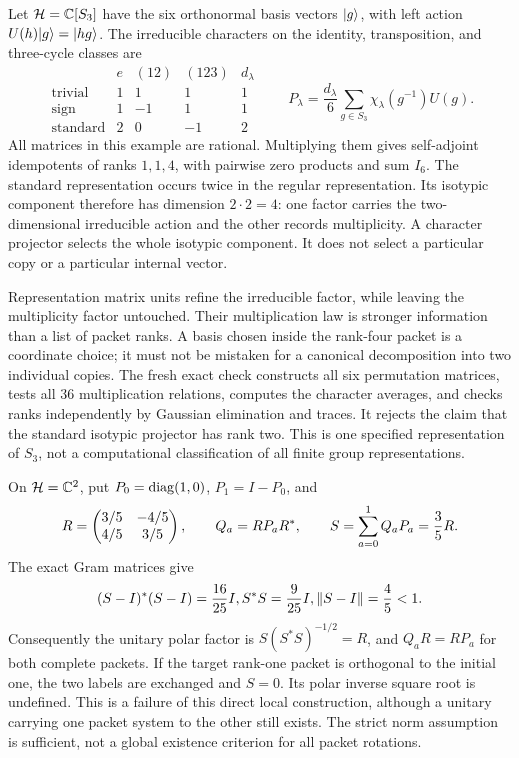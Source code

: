Let $\HH=\CC[S_3]$ have the six orthonormal basis vectors $\lvert g\rangle$, with left action $U(h)\lvert g\rangle=\lvert hg\rangle$. The irreducible characters on the identity, transposition, and three-cycle classes are
\[
\begin{array}{c|rrr|r}
 & e & (12)&(123)&d_\lambda\\\hline
\text{trivial}&1&1&1&1\\
\text{sign}&1&-1&1&1\\
\text{standard}&2&0&-1&2
\end{array}
\qquad
P_\lambda=\frac{d_\lambda}{6}\sum_{g\in S_3}\chi_\lambda(g^{-1})U(g).
\]
All matrices in this example are rational. Multiplying them gives self-adjoint idempotents of ranks $1,1,4$, with pairwise zero products and sum $I_6$.
The standard representation occurs twice in the regular representation. Its isotypic component therefore has dimension $2\cdot2=4$: one factor carries the two-dimensional irreducible action and the other records multiplicity. A character projector selects the whole isotypic component. It does not select a particular copy or a particular internal vector.

Representation matrix units refine the irreducible factor, while leaving the multiplicity factor untouched. Their multiplication law is stronger information than a list of packet ranks. A basis chosen inside the rank-four packet is a coordinate choice; it must not be mistaken for a canonical decomposition into two individual copies.
The fresh exact check constructs all six permutation matrices, tests all $36$ multiplication relations, computes the character averages, and checks ranks independently by Gaussian elimination and traces. It rejects the claim that the standard isotypic projector has rank two. This is one specified representation of $S_3$, not a computational classification of all finite group representations.

On $\HH=\CC^2$, put $P_0=\operatorname{diag}(1,0)$, $P_1=I-P_0$, and
\[
R=\begin{pmatrix}3/5&-4/5\\4/5&3/5\end{pmatrix},\qquad Q_a=RP_aR^*,
\qquad S=\sum_{a=0}^1Q_aP_a=\frac35R.
\]
The exact Gram matrices give
\[
(S-I)^*(S-I)=\frac{16}{25}I, S^*S=\frac9{25}I,
\left\lVert S-I\right\rVert=\frac45<1.
\]
Consequently the unitary polar factor is $S(S^*S)^{-1/2}=R$, and $Q_aR=RP_a$ for both complete packets.
If the target rank-one packet is orthogonal to the initial one, the two labels are exchanged and $S=0$. Its polar inverse square root is undefined. This is a failure of this direct local construction, although a unitary carrying one packet system to the other still exists. The strict norm assumption is sufficient, not a global existence criterion for all packet rotations.

